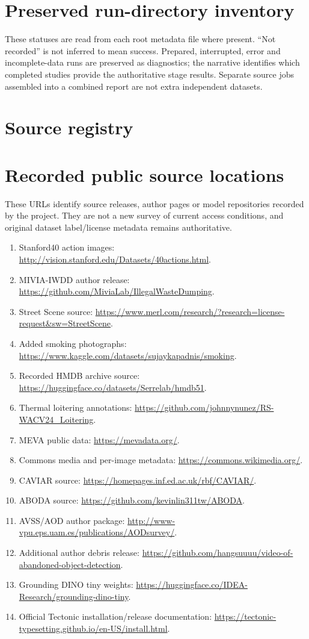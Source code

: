 \section{Preserved run-directory inventory}
These statuses are read from each root metadata file where present. ``Not recorded'' is not inferred to mean success. Prepared, interrupted, error and incomplete-data runs are preserved as diagnostics; the narrative identifies which completed studies provide the authoritative stage results. Separate source jobs assembled into a combined report are not extra independent datasets.

\section{Source registry}


\section{Recorded public source locations}
These URLs identify source releases, author pages or model repositories recorded by the project. They are not a new survey of current access conditions, and original dataset label/license metadata remains authoritative.
\begin{enumerate}
\item Stanford40 action images: \url{http://vision.stanford.edu/Datasets/40actions.html}.
\item MIVIA-IWDD author release: \url{https://github.com/MiviaLab/IllegalWasteDumping}.
\item Street Scene source: \url{https://www.merl.com/research/?research=license-request&sw=StreetScene}.
\item Added smoking photographs: \url{https://www.kaggle.com/datasets/sujaykapadnis/smoking}.
\item Recorded HMDB archive source: \url{https://huggingface.co/datasets/Serrelab/hmdb51}.
\item Thermal loitering annotations: \url{https://github.com/johnnynunez/RS-WACV24_Loitering}.
\item MEVA public data: \url{https://mevadata.org/}.
\item Commons media and per-image metadata: \url{https://commons.wikimedia.org/}.
\item CAVIAR source: \url{https://homepages.inf.ed.ac.uk/rbf/CAVIAR/}.
\item ABODA source: \url{https://github.com/kevinlin311tw/ABODA}.
\item AVSS/AOD author package: \url{http://www-vpu.eps.uam.es/publications/AODsurvey/}.
\item Additional author debris release: \url{https://github.com/hangsuuuu/video-of-abandoned-object-detection}.
\item Grounding DINO tiny weights: \url{https://huggingface.co/IDEA-Research/grounding-dino-tiny}.
\item Official Tectonic installation/release documentation: \url{https://tectonic-typesetting.github.io/en-US/install.html}.
\end{enumerate}

